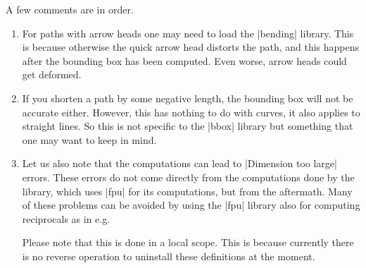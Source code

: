 A few comments are in order.
%
\begin{enumerate}
    \item For paths with arrow heads one may need to load the |bending|
        library. This is because otherwise the quick arrow head distorts the
        path, and this happens after the bounding box has been computed. Even
        worse, arrow heads could get deformed.
    \item If you shorten a path by some negative length, the bounding box will
        not be accurate either. However, this has nothing to do with curves, it
        also applies to straight lines. So this is not specific to the |bbox|
        library but something that one may want to keep in mind.
    \item Let us also note that the computations can lead to
        |Dimension too large| errors. These errors do not come directly from
        the computations done by the library, which uses |fpu| for its
        computations, but from the aftermath. Many of these problems can be
        avoided by using the |fpu| library also for computing reciprocals as in
        e.g.
\begin{codeexample}[preamble={\usetikzlibrary{bbox}}]
\end{codeexample}
        Please note that this is done in a local scope. This is because
        currently there is no reverse operation to uninstall these definitions
        at the moment.
\end{enumerate}

\endinput


